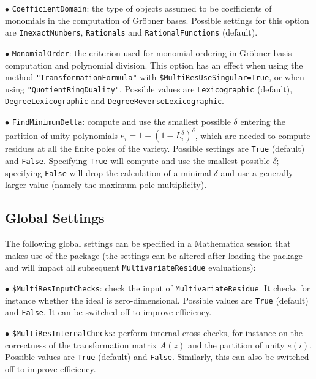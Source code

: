 \documentclass[dvipsnames,preprint,12pt,sort&compress]{elsarticle}
\newcommand{\Math}[1]
{\lstinline[style=Mathematica,breaklines=false,basicstyle=\small \ttfamily\null]~#1~}
\begin{document}
\vspace{2mm}\noindent$\bullet$
\Math{CoefficientDomain}: the type of objects assumed to be coefficients of monomials in the computation of Gr\"obner bases.
Possible settings for this option are \Math{InexactNumbers}, \Math{Rationals} and \Math{RationalFunctions} (default).

\vspace{2mm}\noindent$\bullet$
\Math{MonomialOrder}: the criterion used for monomial ordering in Gr\"obner basis computation and polynomial division. This option has an effect when using the method \Math{"TransformationFormula"} with \Math{$MultiResUseSingular=True}, or when using \Math{"QuotientRingDuality"}. Possible values are \Math{Lexicographic} (default), \Math{DegreeLexicographic} and \Math{DegreeReverseLexicographic}.

\vspace{2mm}\noindent$\bullet$
\Math{FindMinimumDelta}: compute and use the smallest possible $\delta$ entering the partition-of-unity polynomials $e_i=1-(1-L_i^\delta)^\delta$, which are needed to compute residues at all the finite poles of the variety. Possible settings are \Math{True} (default) and \Math{False}. Specifying \Math{True} will compute and use the smallest possible $\delta$; specifying \Math{False} will drop the calculation of a minimal $\delta$ and use a generally larger value (namely the maximum pole multiplicity).


\subsection{Global Settings}
\label{sec:globalsettings}
The following global settings can be specified in a Mathematica session that makes use of the package (the settings can be altered after loading the package and will impact all subsequent \Math{MultivariateResidue} evaluations):

\vspace{2mm}\noindent$\bullet$
\Math{$MultiResInputChecks}: check the input of \Math{MultivariateResidue}. It checks for instance whether the ideal is zero-dimensional. Possible values are \Math{True} (default) and \Math{False}. It can be switched off to improve efficiency.

\vspace{2mm}\noindent$\bullet$
\Math{$MultiResInternalChecks}: perform internal cross-checks, for instance on the correctness of the transformation matrix $A(z)$ and the partition of unity $e(i)$. Possible values are \Math{True} (default) and \Math{False}. Similarly, this can also be switched off to improve efficiency.
\end{document}
